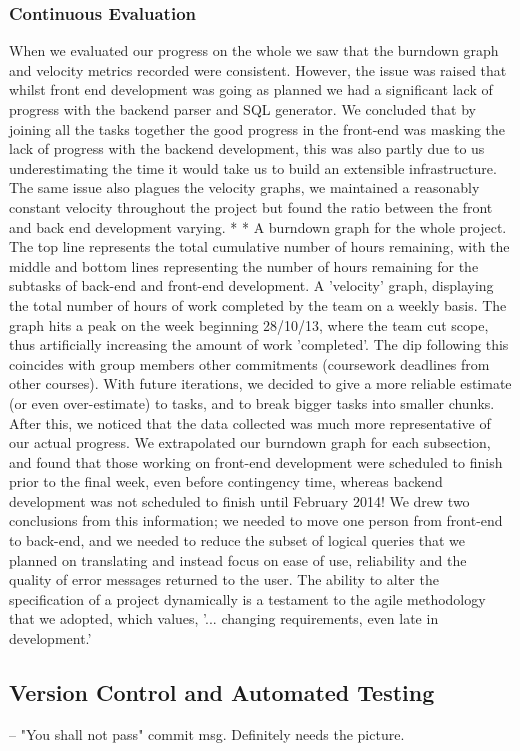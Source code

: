 \documentclass[a4paper, 11pt]{article}
\begin{document}
\subsubsection{ Continuous Evaluation}
When we evaluated our progress on the whole we saw that the burndown graph and velocity metrics recorded were consistent. However, the issue was raised that whilst front end development was going as planned we had a significant lack of progress with the backend parser and SQL generator.
We concluded that by joining all the tasks together the good progress in the front-end was masking the lack of progress with the backend development, this was also partly due to us underestimating the time it would take us to build an extensible infrastructure. The same issue also plagues the velocity graphs, we maintained a reasonably constant velocity throughout the project but found the ratio between the front and back end development varying.
*
*
A burndown graph for the whole project. The top line represents the total cumulative number of hours remaining, with the middle and bottom lines representing the number of hours remaining for the subtasks of back-end and front-end development.
A 'velocity' graph, displaying the total number of hours of work completed by the team on a weekly basis. The graph hits a peak on the week beginning 28/10/13, where the team cut scope, thus artificially increasing the amount of work 'completed'. The dip following this coincides with group members other commitments (coursework deadlines from other courses).
With future iterations, we decided to give a more reliable estimate (or even over-estimate) to tasks, and to break bigger tasks into smaller chunks. After this, we noticed that the data collected was much more representative of our actual progress. We extrapolated our burndown graph for each subsection, and found that those working on front-end development were scheduled to finish prior to the final week, even before contingency time, whereas backend development was not scheduled to finish until February 2014! We drew two conclusions from this information; we needed to move one person from front-end to back-end, and we needed to reduce the subset of logical queries that we planned on translating and instead focus on ease of use, reliability and the quality of error messages returned to the user. 
The ability to alter the specification of a project dynamically is a testament to the agile methodology that we adopted, which values, '... changing requirements, even late in development.' 
  \subsection{Version Control and Automated Testing}
  -- "You shall not pass" commit msg. Definitely needs the picture.
\end{document}
